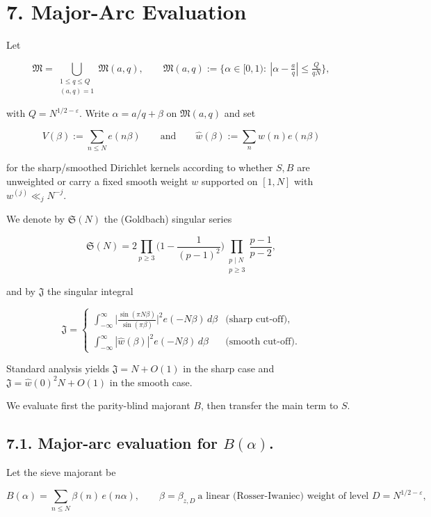 \documentclass[11pt]{article}
\theoremstyle{definition}
\theoremstyle{remark}
\begin{document}
\section*{7. Major-Arc Evaluation}

Let

$$
	\mathfrak M=\bigcup_{\substack{1\le q\le Q\\(a,q)=1}}\mathfrak M(a,q),\qquad
	\mathfrak M(a,q):=\{\alpha\in[0,1):\ |\alpha-\tfrac aq|\le \tfrac{Q}{qN}\},
$$

with $Q=N^{1/2-\varepsilon}$. Write $\alpha=a/q+\beta$ on $\mathfrak M(a,q)$ and set

$$
	V(\beta):=\sum_{n\le N}e(n\beta) \qquad\text{and}\qquad \widehat w(\beta):=\sum_{n}w(n)e(n\beta)
$$

for the sharp/smoothed Dirichlet kernels according to whether $S, B$ are unweighted or carry a fixed smooth weight $w$ supported on $[1,N]$ with $w^{(j)}\ll_j N^{-j}$.

We denote by $\mathfrak S(N)$ the (Goldbach) singular series

$$
	\mathfrak S(N)=2\prod_{p\ge 3}\Big(1-\frac1{(p-1)^2}\Big)
	\prod_{\substack{p\mid N\\ p\ge 3}}\frac{p-1}{p-2},
$$

and by $\mathfrak J$ the singular integral

$$
	\mathfrak J=
	\begin{cases}
		\displaystyle \int_{-\infty}^{\infty}\Big|\frac{\sin(\pi N\beta)}{\sin(\pi\beta)}\Big|^{\!2}e(-N\beta)\,d\beta
		 & \text{(sharp cut-off)},  \\[2ex]
		\displaystyle \int_{-\infty}^{\infty}|\widehat w(\beta)|^{2}e(-N\beta)\,d\beta
		 & \text{(smooth cut-off)}.
	\end{cases}
$$

Standard analysis yields $\mathfrak J=N+O(1)$ in the sharp case and $\mathfrak J=\widehat w(0)^2 N+O(1)$ in the smooth case.

We evaluate first the parity-blind majorant $B$, then transfer the main term to $S$.

\subsection*{7.1. Major-arc evaluation for $B(\alpha)$.}

Let the sieve majorant be

$$
	B(\alpha)=\sum_{n\le N}\beta(n)\,e(n\alpha),\qquad
	\beta=\beta_{z,D}\ \text{a linear (Rosser-Iwaniec) weight of level }D=N^{1/2-\varepsilon},
$$
\end{document}
